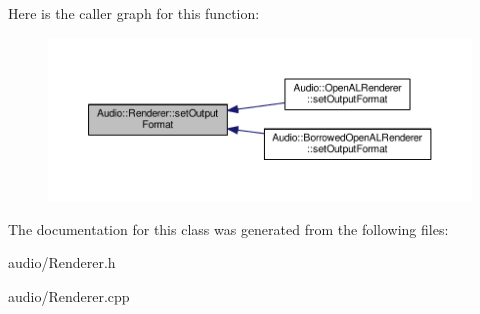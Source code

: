 Here is the caller graph for this function\+:
\nopagebreak
\begin{figure}[H]
\begin{center}
\leavevmode
\includegraphics[width=350pt]{da/d03/classAudio_1_1Renderer_a7391a38b1a07158d53467d1019c741e9_icgraph}
\end{center}
\end{figure}




The documentation for this class was generated from the following files\+:\begin{DoxyCompactItemize}
\item 
audio/Renderer.\+h\item 
audio/Renderer.\+cpp\end{DoxyCompactItemize}
